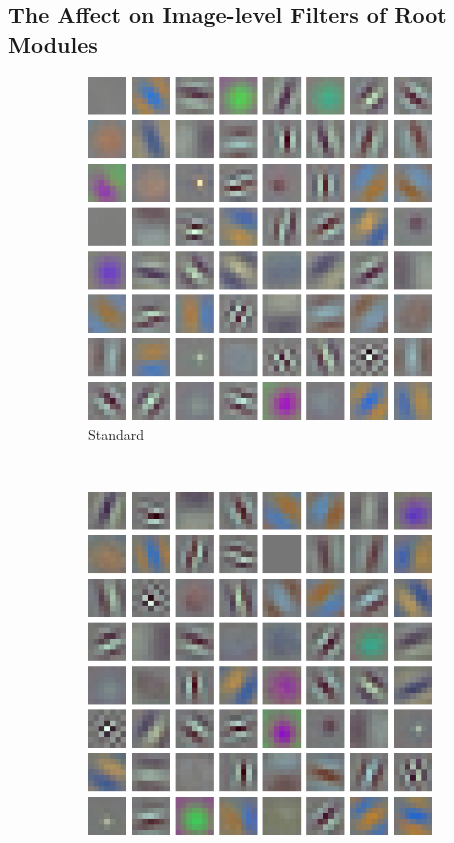 \documentclass[thesis]{subfiles}
\begin{document}
	\subsection{The Affect on Image-level Filters of Root Modules}
	\begin{figure}[tb]
		\centering
		\begin{subfigure}[b]{0.45\linewidth}
			\centering
			\includegraphics[width=\linewidth]{Figs/Raster/msrc-resnet-50-conv1}
			\caption{Standard}
			\label{fig:resnet50normalconv0}
		\end{subfigure}
		~
		\begin{subfigure}[b]{0.45\linewidth}
			\centering
			\includegraphics[width=\linewidth]{Figs/Raster/msrc-resnet-50-conv1-root4-convonly}

\end{subfigure}
\end{figure}
\end{document}

